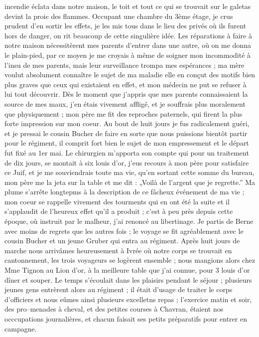 \documentclass[12pt]{article}
\begin{document}
 incendie éclata dans notre maison, le toit et tout ce
qui se trouvait sur le galetas devint la proie des flammes. Occupant une chambre du 3ème étage, je
crus prudent d’en sortir les effets, je les mis tous dans le lieu des privés où ils furent hors de
danger, on rit beaucoup de cette singulière idée. Les réparations à faire à notre maison
nécessitèrent mes parents d’entrer dans une autre, où on me donna le plain-pied, par ce moyen je me
croyais à même de soigner mon incommodité à l’insu de mes parents, mais leur surveillance trompa mes
espérances ; ma mère voulut absolument connaître le sujet de ma maladie elle en conçut des motifs
bien plus graves que ceux qui existaient en effet, et mon médecin ne put se refuser à lui tout
découvrir. Dès le moment que j’appris que mes parents connaissaient la source de mes maux, j’en
étais vivement affligé, et je souffrais plus moralement que physiquement ; mon père me fit des
reproches paternels, qui firent la plus forte impression sur mon coeur. Au bout de huit jours je fus
radicalement guéri, et je pressai le cousin Bucher de faire en sorte que nous puissions bientôt
partir pour le régiment, il comprit fort bien le sujet de mon empressement et le départ fut fixé au
1er mai. Le chirurgien m’apporta son compte qui pour un traitement de dix jours, se montait à six
louis d’or, j’eus recours à mon père pour satisfaire ce Juif, et je me souviendrais toute ma vie,
qu’en sortant cette somme du bureau, mon père me la jeta sur la table et me dit : „Voilà de l’argent
que je regrette.” Ma plume s’arrête longtepms à la description de ce fâcheux événement de ma vie ;
mon coeur se rappelle vivement des tourments qui en ont été la suite et il s’applaudit de l’heureux
effet qu’il a produit ; c’est à peu près depuis cette époque, où instruit par le malheur, j’ai
renoncé au libertinage. Je partis de Berne avec moins de regrets que les autres fois ; le voyage se
fit agréablement avec le cousin Bucher et un jeune Gruber qui entra au régiment. Après huit jours de
marche nous arrivâmes heureusement à Ivrée où notre corps se trouvait en cantonnement, les trois
voyageurs se logèrent ensemble ; nous mangions alors chez Mme Tignon au Lion d’or, à la meilleure
table que j’ai connue, pour 3 louis d’or dîner et souper. Le temps s’écoulait dans les plaisirs
pendant le séjour ; plusieurs jeunes gens entrèrent alors au régiment ; il était d’usage de traiter
le corps d’officiers et nous eûmes ainsi plusieurs excelletns repas ; l’exercice matin et soir, des
pro–menades à cheval, et des petites courses à Chavran, étaient nos occcupations journalières, et
chacun faisait ses petits préparatifs pour entrer en campagne.
\end{document}
